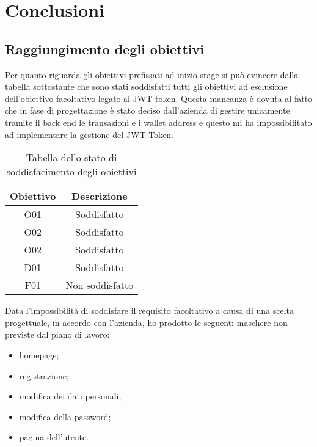 
\chapter{Conclusioni}
\label{cap:conclusioni}

\section{Raggiungimento degli obiettivi}

Per quanto riguarda gli obiettivi prefissati ad inizio stage si può evincere dalla tabella sottostante che sono stati soddisfatti tutti gli obiettivi ad esclusione dell'obiettivo facoltativo legato al JWT token. Questa mancanza è dovuta al fatto che in fase di progettazione è stato deciso dall'azienda di gestire unicamente tramite il back end le transazioni e i wallet address e questo mi ha impossibilitato ad implementare la gestione del JWT Token.

\begin{table}[H]
	\caption{Tabella dello stato di soddisfacimento degli obiettivi}
	\label{tab:obiettivi-raggiunti}
	\renewcommand{\arraystretch}{1.6}
	\begin{center}
	\begin{tabularx}{0.4\textwidth}{c|c}
		\hline\hline
		\textbf{Obiettivo} & \textbf{Descrizione}\\
		\hline
		O01 & Soddisfatto\\
		\hline
		O02 & Soddisfatto\\
		\hline
		O02 & Soddisfatto\\
		\hline
		D01 & Soddisfatto\\
		\hline
		F01 & Non soddisfatto\\
		\hline
	\end{tabularx}
	\end{center}
\end{table}%

Data l'impossibilità di soddisfare il requisito facoltativo a causa di una scelta progettuale, in accordo con l'azienda, ho prodotto le seguenti maschere non previste dal piano di lavoro:
\begin{itemize}
	\item homepage;
	\item registrazione;
	\item modifica dei dati personali;
	\item modifica della password;
	\item pagina dell'utente.
\end{itemize}


